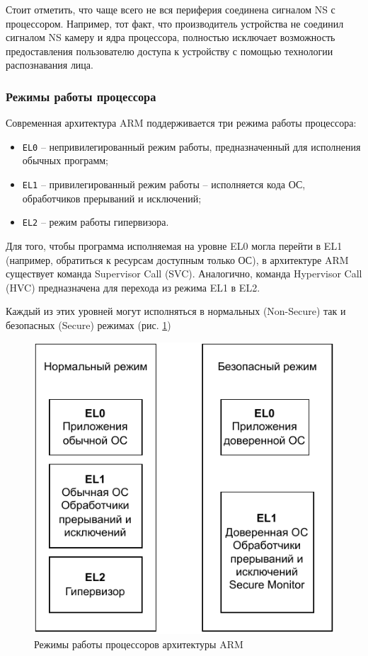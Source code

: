 Стоит отметить, что чаще всего не вся периферия соединена сигналом NS с процессором. Например, тот факт, что производитель устройства не соединил сигналом NS камеру и ядра процессора, полностью исключает возможность предоставления пользователю доступа к устройству с помощью технологии распознавания лица.

\subsubsection{Режимы работы процессора}

Современная архитектура ARM поддерживается три режима работы процессора: 

\begin{itemize}
	\item \texttt{EL0} -- непривилегированный режим работы, предназначенный для исполнения обычных программ;
	\item \texttt{EL1} -- привилегированный режим работы -- исполняется кода ОС, обработчиков прерываний и исключений;
	\item \texttt{EL2} -- режим работы гипервизора.
\end{itemize}

Для того, чтобы программа исполняемая на уровне EL0 могла перейти в EL1 (например, обратиться к ресурсам доступным только ОС), в архитектуре ARM существует команда Supervisor Call (SVC). Аналогично, команда Hypervisor Call (HVC) предназначена для перехода из режима EL1 в EL2.

Каждый из этих уровней могут исполняться в нормальных (Non-Secure) так и безопасных (Secure) режимах (рис. \ref{fig:arm-levels})

\begin{figure}[h]
	\centering
	\includegraphics[width=\textwidth]{img/arm-levels.pdf}
	\caption{Режимы работы процессоров архитектуры ARM}
	\label{fig:arm-levels}
\end{figure}

